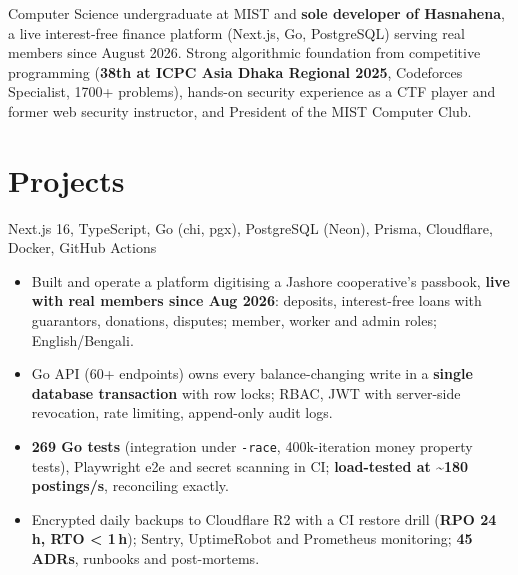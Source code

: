 \documentclass[10pt,a4paper]{article}
\begin{document}

Computer Science undergraduate at MIST and \textbf{sole developer of Hasnahena}, a live interest-free finance
platform (Next.js, Go, PostgreSQL) serving real members since August 2026. Strong algorithmic foundation from
competitive programming (\textbf{38th at ICPC Asia Dhaka Regional 2025}, Codeforces Specialist, 1700+ problems), hands-on
security experience as a CTF player and former web security instructor, and President of the MIST Computer Club.

\vspace{6pt}



\section{Projects}
{ \textbar{} }
{Next.js 16, TypeScript, Go (chi, pgx), PostgreSQL (Neon), Prisma, Cloudflare, Docker, GitHub Actions}
{\begin{itemize}
  \item Built and operate a platform digitising a Jashore cooperative's passbook, \textbf{live with real members since Aug 2026}: deposits, interest-free loans with guarantors, donations, disputes; member, worker and admin roles; English/Bengali.
  \item Go API (60+ endpoints) owns every balance-changing write in a \textbf{single database transaction} with row locks; RBAC, JWT with server-side revocation, rate limiting, append-only audit logs.
  \item \textbf{269 Go tests} (integration under \texttt{-race}, 400k-iteration money property tests), Playwright e2e and secret scanning in CI; \textbf{load-tested at \textasciitilde180 postings/s}, reconciling exactly.
  \item Encrypted daily backups to Cloudflare R2 with a CI restore drill (\textbf{RPO 24\,h, RTO \textless{} 1\,h}); Sentry, UptimeRobot and Prometheus monitoring; \textbf{45 ADRs}, runbooks and post-mortems.
\end{itemize}}






\end{document}
